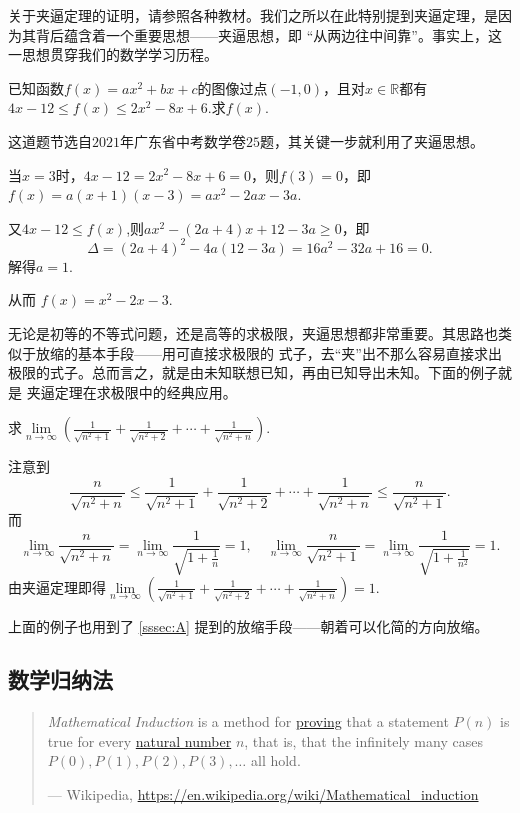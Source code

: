 关于夹逼定理的证明，请参照各种教材。我们之所以在此特别提到夹逼定理，是因为其背后蕴含着一个重要思想——夹逼思想，即
“从两边往中间靠”。事实上，这一思想贯穿我们的数学学习历程。
\begin{example}
    已知函数$f(x)=ax^2+bx+c$的图像过点$(-1,0)$，且对$x\in \mathbb{R}$都有$4x-12\leqslant f(x)\leqslant 2x^2-8x+6$.求$f(x)$.
\end{example}
\begin{solve}
    这道题节选自$2021$年广东省中考数学卷$25$题，其关键一步就利用了夹逼思想。


    当$x=3$时，$4x-12=2x^2-8x+6=0$，则$f(3)=0$，即$f(x)=a(x+1)(x-3)=ax^2-2ax-3a$.


    又$4x-12\leqslant f(x)$,则$ax^2-(2a+4)x+12-3a\geqslant 0$，即
    \[
        \Delta = (2a+4)^2-4a(12-3a)=16a^2-32a+16=0
        .\]
    解得$a=1$.


    从而 $f(x)=x^2-2x-3$.
\end{solve}
无论是初等的不等式问题，还是高等的求极限，夹逼思想都非常重要。其思路也类似于放缩的基本手段——用可直接求极限的
式子，去“夹”出不那么容易直接求出极限的式子。总而言之，就是由未知联想已知，再由已知导出未知。下面的例子就是
夹逼定理在求极限中的经典应用。
\begin{example}
    求$\lim\limits_{n \to \infty}\left( \frac{1}{\sqrt{n^2+1}}+\frac{1}{\sqrt{n^2+2}}+\cdots +\frac{1}{\sqrt{n^2+n}} \right) .$
\end{example}
\begin{solve}
    注意到
    \[
        \frac{n}{\sqrt{n^2+n}}\leqslant \frac{1}{\sqrt{n^2+1}}+\frac{1}{\sqrt{n^2+2}}+\cdots +\frac{1}{\sqrt{n^2+n}}
        \leqslant \frac{n}{\sqrt{n^2+1}}
        .\]
    而
    \[
        \lim\limits_{n \to \infty}\frac{n}{\sqrt{n^2+n}}=\lim\limits_{n \to \infty}\frac{1}{\sqrt{1+\frac{1}{n}}}=1,\quad
        \lim\limits_{n \to \infty}\frac{n}{\sqrt{n^2+1}}=\lim\limits_{n \to \infty}\frac{1}{\sqrt{1+\frac{1}{n^2}}}=1
        .\]
    由夹逼定理即得$\lim\limits_{n \to \infty}\left( \frac{1}{\sqrt{n^2+1}}+\frac{1}{\sqrt{n^2+2}}+\cdots +\frac{1}{\sqrt{n^2+n}} \right) =1$.
\end{solve}
上面的例子也用到了 \autoref{sssec:A} 提到的放缩手段——朝着可以化简的方向放缩。
\subsection{数学归纳法}
\begin{quote}
    \emph{Mathematical Induction} is a method for \href{https://en.wikipedia.org/wiki/Mathematical_proof}{proving}
    that a statement $P(n)$ is true for every \href{https://en.wikipedia.org/wiki/Natural_number}{natural number} $n$,
    that is, that the infinitely many cases $P(0), P(1), P(2), P(3), \ldots$ all hold.
    
    \begin{flushright}
        --- Wikipedia, \url{https://en.wikipedia.org/wiki/Mathematical_induction}
    \end{flushright}
\end{quote}

